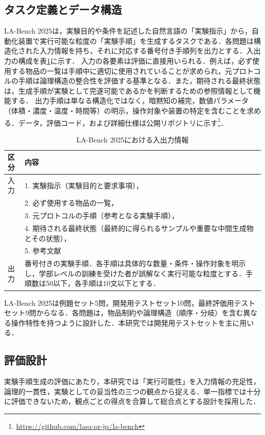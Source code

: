 \documentclass[twocolumn]{jarticle}
\begin{document}
\subsection{タスク定義とデータ構造}
LA-Bench 2025は，実験目的や条件を記述した自然言語の「実験指示」から，自動化装置で実行可能な粒度の「実験手順」を生成するタスクである．各問題は構造化された入力情報を持ち，それに対応する番号付き手順列を出力とする．入出力の構成を表\ref{tab:io_format}に示す．
入力の各要素は評価に直接用いられる．例えば，必ず使用する物品の一覧は手順中に適切に使用されていることが求められ，元プロトコルの手順は論理構造の整合性を評価する基準となる．また，期待される最終状態は，生成手順が実験として完遂可能であるかを判断するための参照情報として機能する．
出力手順は単なる構造化ではなく，暗黙知の補完，数値パラメータ（体積・濃度・温度・時間等）の明示，操作対象や装置の特定を含むことを求める．データ，評価コード，および詳細仕様は公開リポジトリに示す\footnote{\url{https://github.com/lasa-or-jp/la-bench}}．


\begin{table}[t]
    \centering
    \caption{LA-Bench 2025における入出力情報}
    \label{tab:io_format}
    \begin{tabular}{lp{6.5cm}}
    \toprule
    区分 & 内容 \\
    \midrule
    入力 & 1. 実験指示（実験目的と要求事項），\\
    & 2. 必ず使用する物品の一覧， \\
    & 3. 元プロトコルの手順（参考となる実験手順），\\
    & 4. 期待される最終状態（最終的に得られるサンプルや重要な中間生成物とその状態），\\
    & 5. 参考文献 \\
    \midrule
    出力 & 番号付きの実験手順．各手順は具体的な数量・条件・操作対象を明示し，学部レベルの訓練を受けた者が誤解なく実行可能な粒度とする．手順数は50以下，各手順は10文以下とする．\\
    \bottomrule
    \end{tabular}
\end{table}

LA-Bench 2025は例題セット5問，開発用テストセット10問，最終評価用テストセット9問からなる．各問題は，物品制約や論理構造（順序・分岐）を含む異なる操作特性を持つように設計した．本研究では開発用テストセットを主に用いる．

\subsection{評価設計}
実験手順生成の評価にあたり，本研究では「実行可能性」を入力情報の充足性，論理的一貫性，実験としての妥当性の三つの観点から捉える．単一指標では十分に評価できないため，観点ごとの得点を合算して総合点とする設計を採用した．
\end{document}
